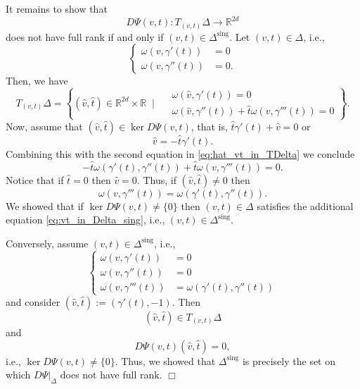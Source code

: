\documentclass[12pt]{article}
\newcommand{\proofend}{$\Box$\bigskip}
\newcommand{\R}{{\mathbb R}}
\begin{document}
It remains to show that
\begin{equation}\nonumber
D\Psi(v,t):T_{(v,t)}\Delta\to \R^{2d}
\end{equation}
does not have full rank if and only if $(v,t)\in\Delta^{\mathrm{sing}}$. Let $(v,t)\in\Delta$, i.e., 
\begin{equation}\label{eq:vt_in_Delta}
\left\{
\begin{aligned}
\omega(v,\gamma'(t))&=0\\
\omega(v,\gamma''(t))&=0.
\end{aligned}
\right.
\end{equation}
Then, we have
\begin{equation}\label{eq:hat_vt_in_TDelta}
T_{(v,t)}\Delta=\left\{
(\hat v, \hat t)\in\R^{2d}\times\R\;\;\Bigg|\;\;
\begin{aligned}
&\omega(\hat v,\gamma'(t))=0\\
&\omega(\hat v,\gamma''(t))+\hat t\omega(v,\gamma'''(t))=0
\end{aligned}
\right\}.
\end{equation}
Now, assume that $(\hat v,\hat t)\in\ker D\Psi(v,t)$, that is, $\hat t\gamma'(t)+\hat v=0$ or
\begin{equation}\nonumber
\hat v=-\hat t\gamma'(t).
\end{equation}
Combining this with the second equation in \eqref{eq:hat_vt_in_TDelta} we conclude
\begin{equation}\nonumber
-\hat t\omega(\gamma'(t),\gamma''(t))+\hat t\omega(v,\gamma'''(t))=0.
\end{equation}
Notice that if $\hat t=0$ then $\hat v=0$. Thus, if $(\hat v,\hat t)\neq0$ then
\begin{equation}\label{eq:vt_in_Delta_sing}
\omega(v,\gamma'''(t))=\omega(\gamma'(t),\gamma''(t)).
\end{equation}
We showed that if $\ker D\Psi(v,t)\neq\{0\}$ then $(v,t)\in\Delta$ satisfies the additional equation \eqref{eq:vt_in_Delta_sing}, i.e., $(v,t)\in \Delta^{\mathrm{sing}}$. 

Conversely, assume $(v,t)\in \Delta^{\mathrm{sing}}$, i.e.,
\begin{equation}\nonumber
\left\{
\begin{aligned}
\omega(v,\gamma'(t))&=0\\
\omega(v,\gamma''(t))&=0\\
\omega(v,\gamma'''(t))&=\omega(\gamma'(t),\gamma''(t))
\end{aligned}
\right.
\end{equation}
and consider $(\hat v,\hat t):=(\gamma'(t),-1)$. Then
\begin{equation}\nonumber
(\hat v,\hat t)\in T_{(v,t)}\Delta
\end{equation}
and
\begin{equation}\nonumber
D\Psi(v,t)(\hat v,\hat t)=0,
\end{equation}
i.e., $\ker D\Psi(v,t)\neq\{0\}$. Thus, we showed that $\Delta^{\mathrm{sing}}$ is precisely the set on which $D\Psi|_\Delta$ does not have full rank.  
\proofend
\end{document}
